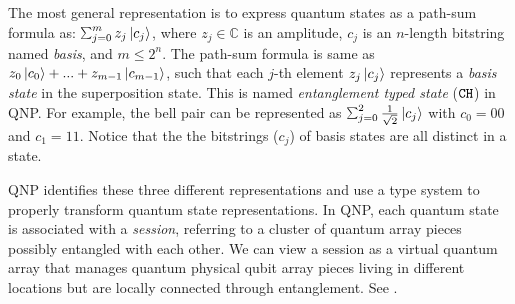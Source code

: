 The most general representation is to express quantum states as a path-sum formula as: $\sch{m}{z_j}{c_j}$, where $z_j\in \mathbb{C}$ is an amplitude, $c_j$ is an $n$-length bitstring named \emph{basis}, and $m \le 2^n$. The path-sum formula is same as ${z_0}\left\vert{c_0}\right\rangle+...+{z_{m-1}}\left\vert{c_{m-1}}\right\rangle$, such that each $j$-th element ${z_j}\left\vert{c_j}\right\rangle$ represents a \emph{basis state} in the superposition state. 
This is named \textit{entanglement typed state} ($\texttt{CH}$) in QNP.
For example, the bell pair can be represented as $\sch{2}{\frac{1}{\sqrt{2}}}{c_j}$ with $c_0=00$ and $c_1=11$.
Notice that the the bitstrings ($c_j$) of basis states are all distinct in a state. 

QNP identifies these three different representations and use a type system to properly transform quantum state representations.
In QNP, each quantum state is associated with a \emph{session}, referring to a cluster of quantum array pieces possibly entangled with each other. We can view a session as a virtual quantum array that manages quantum physical qubit array pieces living in different locations but are locally connected through entanglement. See .

